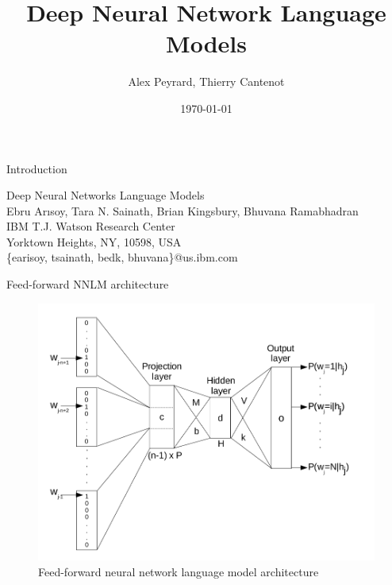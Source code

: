 \documentclass{beamer}
\title[DNNLM]{Deep Neural Network Language Models}
\author[A. Peyrard, T. Cantenot]{Alex Peyrard, Thierry Cantenot}
\institute{Shanghai JiaoTong University}
\date{\today}
\begin{document}
\begin{frame}[plain]
	  \titlepage
\end{frame}
\begin{frame}{Introduction}
\begin{center}
Deep Neural Networks Language Models\\
Ebru Arısoy, Tara N. Sainath, Brian Kingsbury, Bhuvana Ramabhadran\\
IBM T.J. Watson Research Center\\
Yorktown Heights, NY, 10598, USA\\
\{earisoy, tsainath, bedk, bhuvana\}@us.ibm.com
\end{center}

\end{frame}


\begin{frame}{Feed-forward NNLM architecture}

    \begin{figure}[!htb]\centering
        \includegraphics[width=0.8\linewidth]{./images/architecture.png}
        \caption{Feed-forward neural network language model architecture}\label{diagram:architecture}
    \end{figure}

\end{frame}
\end{document}
